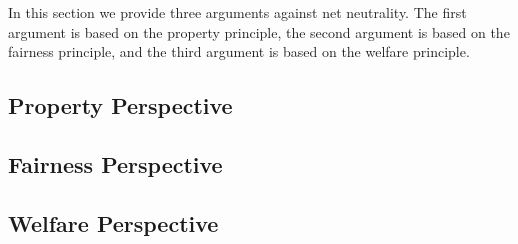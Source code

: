 
In this section we provide three arguments against net neutrality. The first argument is based on the property principle, the second argument is based on the fairness principle, and the third argument is based on the welfare principle.

\subsection{Property Perspective}
\label{sec:arguments_property}


\subsection{Fairness Perspective~\cite{kramer2013fair}}
\label{sec:arguments_fairness}


\subsection{Welfare Perspective}
\label{sec:arguments_welfare}

